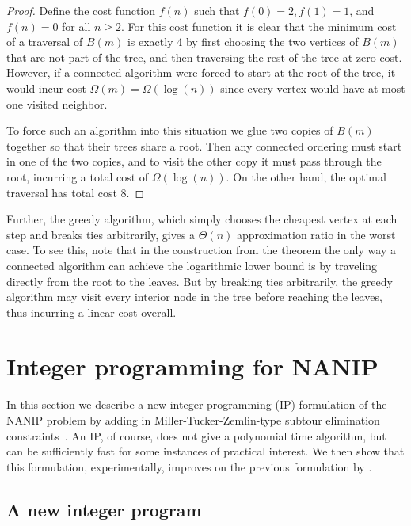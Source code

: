 \documentclass[english]{llncs}
\begin{document}
\begin{proof}
Define the cost function $f(n)$ such that $f(0) = 2, f(1) = 1$, and $f(n) = 0$
for all $n \geq 2$. For this cost function it is clear that the minimum cost of
a traversal of $B(m)$ is exactly 4 by first choosing the two vertices of $B(m)$
that are not part of the tree, and then traversing the rest of the tree at zero
cost. However, if a connected algorithm were forced to start at the root of the
tree, it would incur cost $\Omega(m) = \Omega(\log(n))$ since every vertex
would have at most one visited neighbor. 

To force such an algorithm into this situation we glue two copies of $B(m)$
together so that their trees share a root. Then any connected ordering must
start in one of the two copies, and to visit the other copy it must pass
through the root, incurring a total cost of $\Omega(\log(n))$. On the other
hand, the optimal traversal has total cost 8. 

\end{proof}

Further, the greedy algorithm, which simply chooses the cheapest vertex at each
step and breaks ties arbitrarily, gives a $\Theta(n)$ approximation ratio in
the worst case. To see this, note that in the construction from the theorem the
only way a connected algorithm can achieve the logarithmic lower bound is by
traveling directly from the root to the leaves. But by breaking ties
arbitrarily, the greedy algorithm may visit every interior node in the tree
before reaching the leaves, thus incurring a linear cost overall.



\section{Integer programming for NANIP}\label{section:IP}

In this section we describe a new integer programming (IP) formulation of the
NANIP problem by adding in Miller-Tucker-Zemlin-type subtour elimination
constraints~\cite{miller1960integer}.  An IP, of course, does not give a
polynomial time algorithm, but can be sufficiently fast for some instances of
practical interest.  We then show that this formulation, experimentally,
improves on the previous formulation by \cite{Gutfraind14}.

\subsection{A new integer program}
\end{document}
